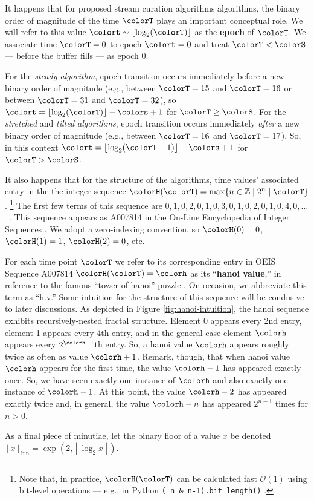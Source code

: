 It happens that for proposed stream curation algorithms algorithms, the binary order of magnitude of the time $\colorT$ plays an important conceptual role.
We will refer to this value $\colort \sim \left\lfloor \log_2(\colorT) \right\rfloor$ as the \textbf{epoch} of $\colorT$.
We associate time $\colorT=0$ to epoch $\colort=0$ and treat $\colorT < \colorS$ --- before the buffer fills --- as epoch 0.

For the \textit{steady algorithm}, epoch transition occurs immediately before a new binary order of magnitude (e.g., between $\colorT = 15$ and $\colorT = 16$ or between $\colorT = 31$ and $\colorT = 32$), so $\colort = \left\lfloor \log_2(\colorT) \right\rfloor - \colors + 1$ for $\colorT \geq \colorS$.
For the \textit{stretched} and \textit{tilted algorithms}, epoch transition occurs immediately \textit{after} a new binary order of magnitude (e.g., between $\colorT = 16$ and $\colorT = 17$).
So, in this context $\colort = \left\lfloor \log_2(\colorT - 1) \right\rfloor - \colors + 1$ for $\colorT > \colorS$.



It also happens that for the structure of the algorithms, time values' associated entry in the the integer sequence $\colorH(\colorT) = \max \{ n \in \mathbb{Z} \mid 2^n \mid \colorT \}$.%
\footnote{%
Note that, in practice, $\colorH(\colorT)$ can be calculated fast $\mathcal{O}(1)$ using bit-level operations --- e.g., in Python \texttt{(~n \& n-1).bit\_length()} \citep{oeis}.
}
The first few terms of this sequence are $0,\allowbreak 1,\allowbreak 0,\allowbreak 2,\allowbreak 0,\allowbreak 1,\allowbreak 0,\allowbreak 3,\allowbreak 0,\allowbreak 1,\allowbreak 0,\allowbreak 2,\allowbreak 0,\allowbreak 1,\allowbreak 0,\allowbreak 4,\allowbreak 0,\allowbreak \ldots$ \, .
This sequence appears as A007814 in the On-Line Encyclopedia of Integer Sequences \citep{oeis}.
We adopt a zero-indexing convention, so $\colorH(0) = 0$, $\colorH(1) = 1$, $\colorH(2) = 0$, etc.

For each time point $\colorT$ we refer to its corresponding entry in OEIS Sequence A007814 $\colorH(\colorT) = \colorh$ as its ``\textbf{hanoi value},'' in reference to the famous ``tower of hanoi'' puzzle \citep{lucas1889jeux}.
On occasion, we abbreviate this term as ``h.v.''
Some intuition for the structure of this sequence will be condusive to later discussions.
As depicted in Figure \ref{fig:hanoi-intuition}, the hanoi sequence exhibits recursively-nested fractal structure.
Element 0 appears every 2nd entry, element 1 appears every 4th entry, and in the general case element $\colorh$ appears every $2^{\colorh+1}$th entry.
So, a hanoi value $\colorh$ appears roughly twice as often as value $\colorh + 1$.
Remark, though, that when hanoi value $\colorh$ appears for the first time, the value $\colorh - 1$ has appeared exactly once.
So, we have seen exactly one instance of $\colorh$ and also exactly one instance of $\colorh - 1$.
At this point, the value $\colorh - 2$ has appeared exactly twice and, in general, the value $\colorh - n$ has appeared $2^{n - 1}$ times for $n > 0$.

As a final piece of minutiae, let the binary floor of a value $x$ be denoted $\left\lfloor x \right\rfloor_\mathrm{bin} = \exp(2, \left\lfloor \log_2 x \right\rfloor)$.
